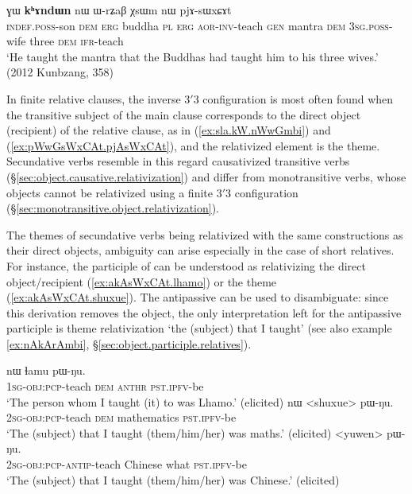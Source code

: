  
\begin{exe}
\ex \label{ex:pWwGsWxCAt.pjAsWxCAt}
 ɣɯ \textbf{kʰɤndɯn} nɯ ɯ-rʑaβ χsɯm nɯ pjɤ-sɯxɕɤt \\
\textsc{indef}.\textsc{poss}-son \textsc{dem} \textsc{erg} buddha \textsc{pl} \textsc{erg} \textsc{aor}-\textsc{inv}-teach \textsc{gen} mantra \textsc{dem} \textsc{3sg}.\textsc{poss}-wife three \textsc{dem} \textsc{ifr}-teach \\
\glt `He taught the mantra that the Buddhas had taught him to his three wives.' (2012 Kunbzang, 358)
\end{exe} 

In finite relative clauses, the inverse 3$'$\fl{}3 configuration is most often found when the transitive subject of the main clause corresponds to the direct object (recipient) of the relative clause, as in (\ref{ex:sla.kW.nWwGmbi}) and (\ref{ex:pWwGsWxCAt.pjAsWxCAt}), and the relativized element is the theme. Secundative verbs resemble in this regard causativized transitive verbs (§\ref{sec:object.causative.relativization}) and differ from monotransitive verbs, whose objects cannot be relativized using a finite  3$'$\fl{}3 configuration (§\ref{sec:monotransitive.object.relativization}).

The themes of secundative verbs being relativized with the same constructions as their direct objects, ambiguity can arise especially in the case of short relatives. For instance, the participle  of  can be understood as relativizing the direct object/recipient (\ref{ex:akAsWxCAt.lhamo}) or the theme (\ref{ex:akAsWxCAt.shuxue}). The antipassive can be used to disambiguate: since this derivation removes the object, the only interpretation left for the antipassive participle  is theme relativization `the (subject) that I taught' (see also example \ref{ex:nAkArAmbi}, §\ref{sec:object.participle.relatives}).

\begin{exe}
\ex 
\begin{xlist}
\ex \label{ex:akAsWxCAt.lhamo}
\gll  [a-kɤ-sɯxɕɤt] nɯ ɬamu pɯ-ŋu. \\
\textsc{1sg}-\textsc{obj}:\textsc{pcp}-teach \textsc{dem}  \textsc{anthr} \textsc{pst}.\textsc{ipfv}-be \\
\glt `The person whom I taught (it) to was Lhamo.' (elicited)
\ex \label{ex:akAsWxCAt.shuxue}
\gll  [a-kɤ-sɯxɕɤt] nɯ  <shuxue> pɯ-ŋu. \\
\textsc{2sg}-\textsc{obj}:\textsc{pcp}-teach \textsc{dem} mathematics \textsc{pst}.\textsc{ipfv}-be \\
\glt `The (subject) that I taught (them/him/her) was maths.' (elicited)
\ex \label{ex:akAsAsWxCAt}
\gll [a-kɤ-sɤ-sɯxɕɤt] <yuwen>  pɯ-ŋu. \\
\textsc{2sg}-\textsc{obj}:\textsc{pcp}-\textsc{antip}-teach Chinese what \textsc{pst}.\textsc{ipfv}-be \\
\glt `The (subject) that I taught (them/him/her) was Chinese.' (elicited)
\end{xlist} 
\end{exe} 

